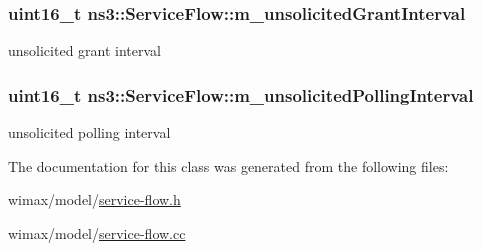 \subsubsection[{\texorpdfstring{m\+\_\+unsolicited\+Grant\+Interval}{m_unsolicitedGrantInterval}}]{\setlength{\rightskip}{0pt plus 5cm}uint16\+\_\+t ns3\+::\+Service\+Flow\+::m\+\_\+unsolicited\+Grant\+Interval\hspace{0.3cm}{\ttfamily [private]}}\hypertarget{classns3_1_1ServiceFlow_a45c54537e6acf68f34a1c3b2f61cefa2}{}\label{classns3_1_1ServiceFlow_a45c54537e6acf68f34a1c3b2f61cefa2}


unsolicited grant interval 

\subsubsection[{\texorpdfstring{m\+\_\+unsolicited\+Polling\+Interval}{m_unsolicitedPollingInterval}}]{\setlength{\rightskip}{0pt plus 5cm}uint16\+\_\+t ns3\+::\+Service\+Flow\+::m\+\_\+unsolicited\+Polling\+Interval\hspace{0.3cm}{\ttfamily [private]}}\hypertarget{classns3_1_1ServiceFlow_a757b8a5d3178773cecb45ba00053207e}{}\label{classns3_1_1ServiceFlow_a757b8a5d3178773cecb45ba00053207e}


unsolicited polling interval 



The documentation for this class was generated from the following files\+:\begin{DoxyCompactItemize}
\item 
wimax/model/\hyperlink{service-flow_8h}{service-\/flow.\+h}\item 
wimax/model/\hyperlink{service-flow_8cc}{service-\/flow.\+cc}\end{DoxyCompactItemize}
